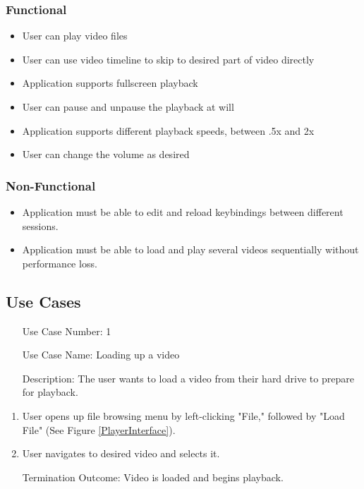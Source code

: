 \documentclass[10pt,conference,onecolumn,compsoc]{IEEEtran}
\begin{document}
\subsubsection{Functional}
\begin{itemize}
\item User can play video files
\item User can use video timeline to skip to desired part of video directly
\item Application supports fullscreen playback 
\item User can pause and unpause the playback at will
\item Application supports different playback speeds, between .5x and 2x
\item User can change the volume as desired
\end{itemize}


\subsubsection{Non-Functional}
\begin{itemize}
\item Application must be able to edit and reload keybindings between different sessions. 
\item Application must be able to load and play several videos sequentially without performance loss.
\end{itemize}

\subsection{Use Cases}

\begin{itemize}
\label{itm:UseCase1}
\item[Use Case Number:] 1
\item[Use Case Name:] Loading up a video
\item[Description:] The user wants to load a video from their hard drive to prepare for playback.
\end{itemize}

\begin{enumerate}
\item User opens up file browsing menu by left-clicking "File," followed by "Load File" (See Figure \ref{PlayerInterface}).
\item User navigates to desired video and selects it.
\item[Termination Outcome:] Video is loaded and begins playback.
\end{enumerate}
\end{document}
